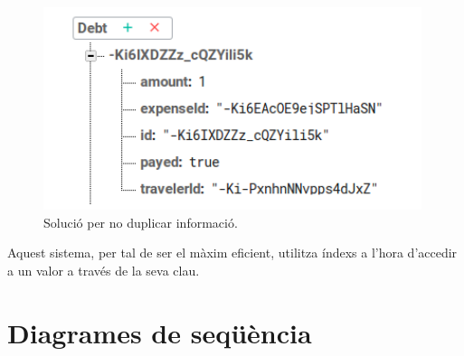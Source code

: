 \begin{figure}[!h]
\centering
\includegraphics[scale=1.00]{Figures/DebtBD.jpg}
\caption{Solució per no duplicar informació.}
\end{figure}

Aquest sistema, per tal de ser el màxim eficient, utilitza índexs a l'hora d'accedir a un valor a través de la seva clau.

\section{Diagrames de seqüència}
